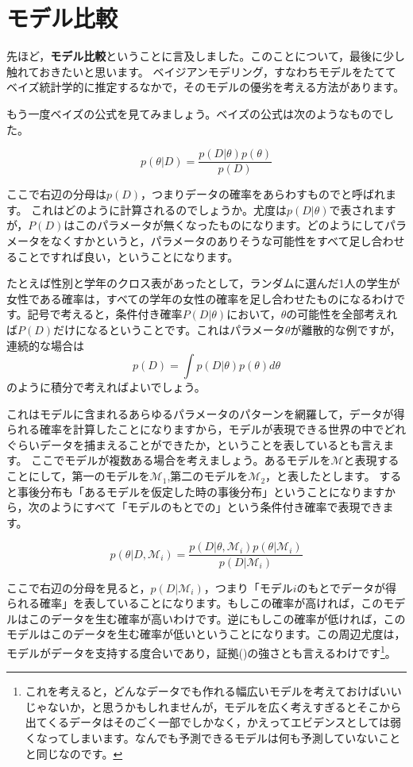 \documentclass{ltjsbook}
\begin{document}
\section{モデル比較}
先ほど，\textbf{モデル比較}ということに言及しました。このことについて，最後に少し触れておきたいと思います。
ベイジアンモデリング，すなわちモデルをたててベイズ統計学的に推定するなかで，そのモデルの優劣を考える方法があります。

もう一度ベイズの公式を見てみましょう。ベイズの公式は次のようなものでした。

\[ p(\theta| D) = \frac{p(D| \theta)p(\theta)}{p(D)} \]

ここで右辺の分母は$p(D)$，つまりデータの確率をあらわすものでと呼ばれます。
これはどのように計算されるのでしょうか。尤度は$p(D| \theta)$で表されますが，$P(D)$はこのパラメータが無くなったものになります。どのようにしてパラメータをなくすかというと，パラメータのありそうな可能性をすべて足し合わせることですれば良い，ということになります。

たとえば性別と学年のクロス表があったとして，ランダムに選んだ1人の学生が女性である確率は，すべての学年の女性の確率を足し合わせたものになるわけです。記号で考えると，条件付き確率$P(D| \theta)$において，$\theta$の可能性を全部考えれば$P(D)$だけになるということです。これはパラメータ$\theta$が離散的な例ですが，連続的な場合は
$$ p(D) = \int p(D | \theta )p(\theta) d\theta $$
のように積分で考えればよいでしょう。

これはモデルに含まれるあらゆるパラメータのパターンを網羅して，データが得られる確率を計算したことになりますから，モデルが表現できる世界の中でどれぐらいデータを捕まえることができたか，ということを表しているとも言えます。
ここでモデルが複数ある場合を考えましょう。あるモデルを$\mathcal{M}$と表現することにして，第一のモデルを$\mathcal{M}_1$,第二のモデルを$\mathcal{M}_2$，と表したとします。
すると事後分布も「あるモデルを仮定した時の事後分布」ということになりますから，次のようにすべて「モデルのもとでの」という条件付き確率で表現できます。

$$ p(\theta | D,\mathcal{M}_i) = \frac{p(D | \theta,\mathcal{M}_i)p(\theta | \mathcal{M}_i)}{p(D| \mathcal{M}_i)} $$

ここで右辺の分母を見ると，$p(D| \mathcal{M}_i)$，つまり「モデル$i$のもとでデータが得られる確率」を表していることになります。もしこの確率が高ければ，このモデルはこのデータを生む確率が高いわけです。逆にもしこの確率が低ければ，このモデルはこのデータを生む確率が低いということになります。この周辺尤度は，モデルがデータを支持する度合いであり，証拠()の強さとも言えるわけです\footnote{これを考えると，どんなデータでも作れる幅広いモデルを考えておけばいいじゃないか，と思うかもしれませんが，モデルを広く考えすぎるとそこから出てくるデータはそのごく一部でしかなく，かえってエビデンスとしては弱くなってしまいます。なんでも予測できるモデルは何も予測していないことと同じなのです。}。
\end{document}

